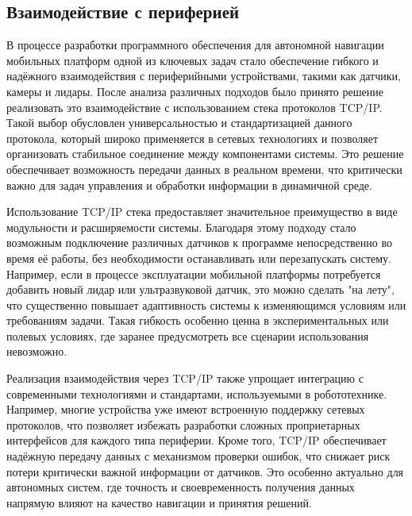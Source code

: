 
\subsection{Взаимодействие с периферией}

В процессе разработки программного обеспечения для автономной навигации
мобильных платформ одной из ключевых задач стало обеспечение гибкого и надёжного
взаимодействия с периферийными устройствами, такими как датчики, камеры и
лидары. После анализа различных подходов было принято решение реализовать это
взаимодействие с использованием стека протоколов TCP/IP. Такой выбор обусловлен
универсальностью и стандартизацией данного протокола, который широко применяется
в сетевых технологиях и позволяет организовать стабильное соединение между
компонентами системы. Это решение обеспечивает возможность передачи данных в
реальном времени, что критически важно для задач управления и обработки
информации в динамичной среде.

Использование TCP/IP стека предоставляет значительное преимущество в виде
модульности и расширяемости системы. Благодаря этому подходу стало возможным
подключение различных датчиков к программе непосредственно во время её работы,
без необходимости останавливать или перезапускать систему. Например, если в
процессе эксплуатации мобильной платформы потребуется добавить новый лидар или
ультразвуковой датчик, это можно сделать "на лету", что существенно повышает
адаптивность системы к изменяющимся условиям или требованиям задачи. Такая
гибкость особенно ценна в экспериментальных или полевых условиях, где заранее
предусмотреть все сценарии использования невозможно.

Реализация взаимодействия через TCP/IP также упрощает интеграцию с современными
технологиями и стандартами, используемыми в робототехнике. Например, многие
устройства уже имеют встроенную поддержку сетевых протоколов, что позволяет
избежать разработки сложных проприетарных интерфейсов для каждого типа
периферии. Кроме того, TCP/IP обеспечивает надёжную передачу данных с механизмом
проверки ошибок, что снижает риск потери критически важной информации от
датчиков. Это особенно актуально для автономных систем, где точность и
своевременность получения данных напрямую влияют на качество навигации и
принятия решений.

%
%
%
%
